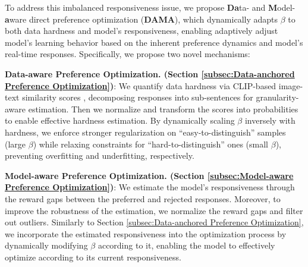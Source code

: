 To address this imbalanced responsiveness issue, we propose \textbf{Da}ta- and \textbf{M}odel-\textbf{a}ware direct preference optimization (\textbf{DAMA}), which dynamically adapts $\beta$ to both data hardness and model's responsiveness, enabling adaptively adjust model's learning behavior based on the inherent preference dynamics and model's real-time responses. 
Specifically, we propose two novel mechanisms:

\textbf{Data-aware Preference Optimization. (Section \ref{subsec:Data-anchored Preference Optimization})}: 
    We quantify data hardness via CLIP-based image-text similarity scores \cite{CLIP}, decomposing responses into sub-sentences for granularity-aware estimation.
    Then we normalize and transform the scores into probabilities to enable effective hardness estimation.
    By dynamically scaling $\beta$ inversely with hardness, we enforce stronger regularization on ``easy-to-distinguish'' samples (large $\beta$) while relaxing constraints for ``hard-to-distinguish'' ones (small $\beta$), preventing overfitting and underfitting, respectively.

\textbf{Model-aware Preference Optimization. (Section \ref{subsec:Model-aware Preference Optimization})}: 
    We estimate the model's responsiveness through the reward gaps between the preferred and rejected responses. Moreover, to improve the robustness of the estimation, we normalize the reward gaps and filter out outliers. 
    Similarly to Section \ref{subsec:Data-anchored Preference Optimization}, we incorporate the estimated responsiveness into the optimization process by dynamically modifying $\beta$ according to it, enabling the model to effectively optimize according to its current responsiveness.

